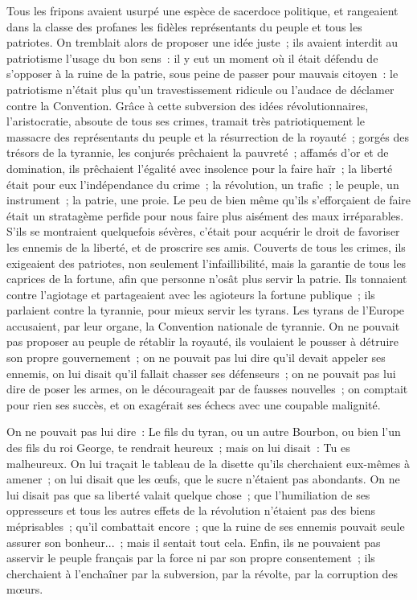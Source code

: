 \documentclass[french,twoside]{book} %
\begin{document}
Tous les fripons avaient usurpé une espèce de sacerdoce politique, et rangeaient dans la classe des profanes les fidèles représentants du peuple et tous les patriotes. On tremblait alors de proposer une idée juste ; ils avaient interdit au patriotisme l’usage du bon sens : il y eut un moment où il était défendu de s’opposer à la ruine de la patrie, sous peine de passer pour mauvais citoyen : le patriotisme n’était plus qu’un travestissement ridicule ou l’audace de déclamer contre la Convention. Grâce à cette subversion des idées révolutionnaires, l’aristocratie, absoute de tous ses crimes, tramait très patriotiquement le massacre des représentants du peuple et la résurrection de la royauté ; gorgés des trésors de la tyrannie, les conjurés prêchaient la pauvreté ; affamés d’or et de domination, ils prêchaient l’égalité avec insolence pour la faire haïr ; la liberté était pour eux l’indépendance du crime ; la révolution, un trafic ; le peuple, un instrument ; la patrie, une proie. Le peu de bien même qu’ils s’efforçaient de faire était un stratagème perfide pour nous faire plus aisément des maux irréparables. S’ils se montraient quelquefois sévères, c’était pour acquérir le droit de favoriser les ennemis de la liberté, et de proscrire ses amis. Couverts de tous les crimes, ils exigeaient des patriotes, non seulement l’infaillibilité, mais la garantie de tous les caprices de la fortune, afin que personne n’osât plus servir la patrie. Ils tonnaient contre l’agiotage et partageaient avec les agioteurs la fortune publique ; ils parlaient contre la tyrannie, pour mieux servir les tyrans. Les tyrans de l’Europe accusaient, par leur organe, la Convention nationale de tyrannie. On ne pouvait pas proposer au peuple de rétablir la royauté, ils voulaient le pousser à détruire son propre gouvernement ; on ne pouvait pas lui dire qu’il devait appeler ses ennemis, on lui disait qu’il fallait chasser ses défenseurs ; on ne pouvait pas lui dire de poser les armes, on le décourageait par de fausses nouvelles ; on comptait pour rien ses succès, et on exagérait ses échecs avec une coupable malignité.\par
On ne pouvait pas lui dire : Le fils du tyran, ou un autre Bourbon, ou bien l’un des fils du roi George, te rendrait heureux ; mais on lui disait : Tu es malheureux. On lui traçait le tableau de la disette qu’ils cherchaient eux-mêmes à amener ; on lui disait que les œufs, que le sucre n’étaient pas abondants. On ne lui disait pas que sa liberté valait quelque chose ; que l’humiliation de ses oppresseurs et tous les autres effets de la révolution n’étaient pas des biens méprisables ; qu’il combattait encore ; que la ruine de ses ennemis pouvait seule assurer son bonheur... ; mais il sentait tout cela. Enfin, ils ne pouvaient pas asservir le peuple français par la force ni par son propre consentement ; ils cherchaient à l’enchaîner par la subversion, par la révolte, par la corruption des mœurs.\par
\end{document}
